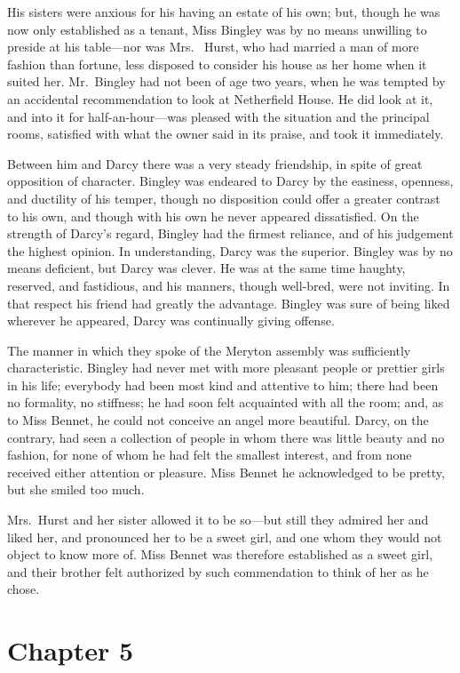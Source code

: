 His sisters were anxious for his having an estate of his own; but,
though he was now only established as a tenant, Miss Bingley
was by no means unwilling to preside at his table---nor was Mrs.\ %
Hurst, who had married a man of more fashion than fortune, less
disposed to consider his house as her home when it suited her.
Mr.\ Bingley had not been of age two years, when he was tempted
by an accidental recommendation to look at Netherfield House.
He did look at it, and into it for half-an-hour---was pleased with
the situation and the principal rooms, satisfied with what the
owner said in its praise, and took it immediately.

Between him and Darcy there was a very steady friendship, in
spite of great opposition of character.  Bingley was endeared to
Darcy by the easiness, openness, and ductility of his temper,
though no disposition could offer a greater contrast to his own,
and though with his own he never appeared dissatisfied.  On the
strength of Darcy's regard, Bingley had the firmest reliance, and
of his judgement the highest opinion.  In understanding, Darcy
was the superior.  Bingley was by no means deficient, but Darcy
was clever.  He was at the same time haughty, reserved, and
fastidious, and his manners, though well-bred, were not inviting.
In that respect his friend had greatly the advantage.  Bingley was
sure of being liked wherever he appeared, Darcy was continually
giving offense.

The manner in which they spoke of the Meryton assembly was
sufficiently characteristic.  Bingley had never met with more
pleasant people or prettier girls in his life; everybody had been
most kind and attentive to him; there had been no formality, no
stiffness; he had soon felt acquainted with all the room; and, as
to Miss Bennet, he could not conceive an angel more beautiful.
Darcy, on the contrary, had seen a collection of people in whom
there was little beauty and no fashion, for none of whom he had
felt the smallest interest, and from none received either attention
or pleasure.  Miss Bennet he acknowledged to be pretty, but she
smiled too much.

Mrs.\ Hurst and her sister allowed it to be so---but still they
admired her and liked her, and pronounced her to be a sweet
girl, and one whom they would not object to know more of.
Miss Bennet was therefore established as a sweet girl, and their
brother felt authorized by such commendation to think of her as
he chose.



\chapter{Chapter 5}


